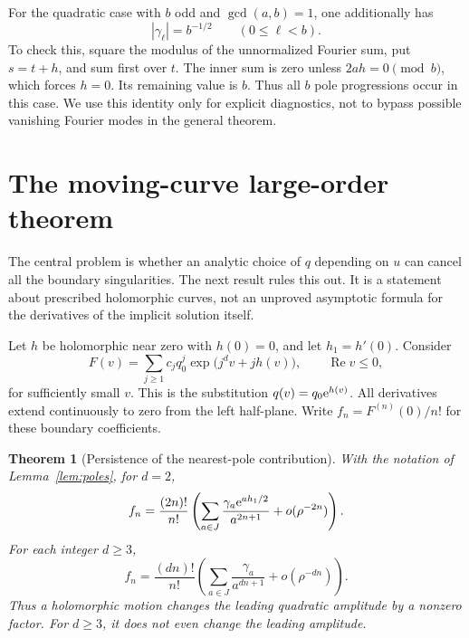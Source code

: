 \documentclass[11pt,a4paper]{article}
\numberwithin{equation}{section}
\newtheorem{theorem}{Theorem}[section]
\theoremstyle{definition}\newtheorem{definition}[theorem]{Definition}
\theoremstyle{remark}\newtheorem{remark}[theorem]{Remark}
\theoremstyle{definition}
\newcommand{\Rea}{\operatorname{Re}}\newcommand{\Ima}{\operatorname{Im}}
\begin{document}
For the quadratic case with $b$ odd and $\gcd(a,b)=1$, one additionally has
\begin{equation}
 |\gamma_\ell|=b^{-1/2}\qquad(0\le\ell<b).
 \label{eq:gauss}
\end{equation}
To check this, square the modulus of the unnormalized Fourier sum, put
$s=t+h$, and sum first over $t$. The inner sum is zero unless
$2ah=0\pmod b$, which forces $h=0$. Its remaining value is $b$.
Thus all $b$ pole progressions occur in this case. We use this identity only
for explicit diagnostics, not to bypass possible vanishing Fourier modes in
the general theorem.

\section{The moving-curve large-order theorem}
\label{sec:moving}
The central problem is whether an analytic choice of $q$ depending on $u$
can cancel all the boundary singularities. The next result rules this out.
It is a statement about prescribed holomorphic curves, not an unproved
asymptotic formula for the derivatives of the implicit solution itself.

Let $h$ be holomorphic near zero with $h(0)=0$, and let $h_1=h'(0)$. Consider
\begin{equation}
 F(v)=\sum_{j\ge1}c_jq_0^j\exp\!\bigl(j^d v+jh(v)\bigr),
 \qquad \Rea v\le0,
 \label{eq:moving-function}
\end{equation}
for sufficiently small $v$. This is the substitution
$q(v)=q_0\mathrm e^{h(v)}$. All derivatives extend continuously to zero from the
left half-plane. Write $f_n=F^{(n)}(0)/n!$ for these boundary coefficients.

\begin{theorem}[Persistence of the nearest-pole contribution]
\label{thm:moving}
With the notation of Lemma~\ref{lem:poles}, for $d=2$,
\begin{equation}
 f_n=\frac{(2n)!}{n!}\left(
       \sum_{a\in J}\frac{\gamma_a\mathrm e^{a h_1/2}}{a^{2n+1}}
       +o(\rho^{-2n})\right).
 \label{eq:moving-quadratic}
\end{equation}
For each integer $d\ge3$,
\begin{equation}
 f_n=\frac{(dn)!}{n!}\left(
       \sum_{a\in J}\frac{\gamma_a}{a^{dn+1}}
       +o(\rho^{-dn})\right).
 \label{eq:moving-higher}
\end{equation}
Thus a holomorphic motion changes the leading quadratic amplitude by a
nonzero factor. For $d\ge3$, it does not even change the leading amplitude.
\end{theorem}
\end{document}
